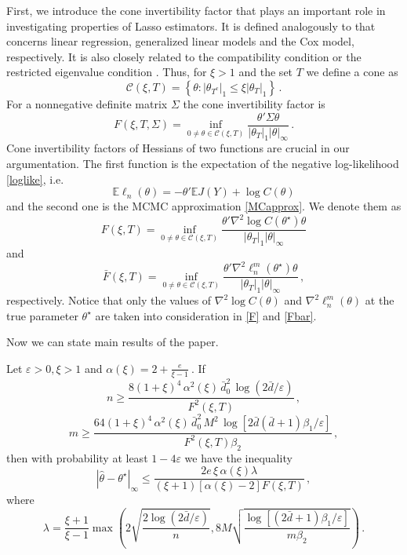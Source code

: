 \documentclass[twoside,11pt]{article}
\def\lln{\ell_n}
\def\llnm{\ell_n^m}
\def\th{\theta}
\def\Ex{\mathbb{E}}
\def\cone{\mathcal{C}}
\def\ths{\th^\star}
\def\hth{\hat{\theta}}
\def\hess{\nabla^2}
\def\bbd{\bar{d}}
\def\bd0{\bar{d} _0}
\def\ef{F(\xi,T)}
\def\bef{\bar{F}(\xi,T)}
\def\eftwo{F^2(\xi,T)}
\begin{document}
First, we introduce the cone invertibility factor that plays an important role in investigating properties of Lasso estimators. It is defined analogously to \citet{YeZhang10, HuangGLM12, Cox13} 
that concerns linear regression, generalized linear models and the Cox model, respectively. 
It is also closely related to the compatibility condition \citep{Geer2008} or the restricted eigenvalue condition \citep{Bickel09}.
Thus, for $\xi>1$ and the set $T$  we define a cone as
\[\cone (\xi,T) = \left\{\th: |\th_{T^c}|_1 \leq \xi |\th_{T}|_1\right\}\,. \]
For a nonnegative definite matrix $\Sigma$ the cone invertibility factor is  
\[
F(\xi, T, \Sigma) = \inf _{0 \neq \th \in \cone (\xi,T)} \frac{ \th ' \Sigma \th}{|\th _T|_1 |\th|_\infty}\,.
\]
Cone invertibility factors of Hessians of two functions are crucial in our argumentation.
The first function is the expectation of the negative log-likelihood \eqref{loglike}, i.e.
\begin{equation}
\label{trueloglike}
\Ex \lln (\th) = - \th ' \Ex J(Y) + \log C(\th)
\end{equation}
and the second one is the MCMC approximation \eqref{MCapprox}.
We denote them as
\begin{equation}
\label{F}
\ef= \inf _{0 \neq \th \in \cone (\xi,T)} \frac{ \th ' \hess \log C(\ths) \th}{|\th _T|_1 |\th|_\infty}
\end{equation}
and 
\begin{equation}
\label{Fbar}
\bef= \inf _{0 \neq \th \in \cone (\xi,T)} \frac{ \th ' \hess \llnm(\ths) \th}{|\th _T|_1 |\th|_\infty} \,,
\end{equation}
respectively. Notice that only the values of $\hess \log C(\th)$ and $\hess \llnm(\th)$ at the true parameter $\ths$ are taken into consideration in \eqref{F} and \eqref{Fbar}.

Now we can state main results of the paper.
\begin{theorem}
\label{main}
Let $\varepsilon > 0, \xi >1$ and $\alpha (\xi)=  2+ \frac{e}{\xi-1}\:.$  If
\begin{equation}
\label{ncond}
n \geq  \frac{8 (1+ \xi)^4 \, \alpha^2 (\xi) \, \bd0 ^2 \, \log(2 \bbd /\varepsilon)}{\eftwo }\,,
\end{equation}
\begin{equation}
\label{mcond}
 m \geq \frac{64 (1+\xi)^4 \, \alpha^2 (\xi) \, \bd0^2  \, M^2\,  \log \left[2 \bbd (\bbd+1)\beta_1 / \varepsilon \right] }{\eftwo  \beta_2} \,,
\end{equation}
then with probability at least $1-4 \varepsilon$ we have the inequality
\begin{equation} 
\label{main_in}
\left|\hth - \ths \right| _\infty \leq \frac{2 e \, \xi \,\alpha(\xi) \lambda}{(\xi +1)
[\alpha(\xi)-2] \ef}\,, 
\end{equation}
where
\begin{equation}
\label{lam}
\lambda = \frac{\xi + 1}{\xi -1}  \max\left( 2 \sqrt{\frac{2 \log(2 \bbd/\varepsilon)}{n}}, 8 M \sqrt{\frac{\log\left[(2 \bbd+1)\beta_1 /\varepsilon\right]}{m \beta_2}}
\right)\,.
\end{equation}
\end{theorem}
\end{document}
